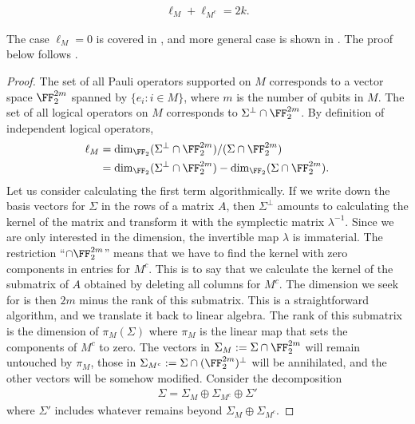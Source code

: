 \begin{prop}
\begin{align*}
\ell_M + \ell_{M^c} = 2k.
\end{align*}
\label{LogicalOperatorCounting}
\end{prop}
The case $\ell_M = 0$ is covered in \cite{BravyiTerhal2009no-go},
and more general case is shown in \cite{YoshidaChuang2010Framework}.
The proof below follows \cite{HaahPreskill2012tradeoff}.
\begin{proof}
The set of all Pauli operators supported on $M$
corresponds to a vector space $\FF_2^{2m}$
spanned by $\{ e_i : i \in M \}$, where $m$
is the number of qubits in $M$.
The set of all logical operators on $M$ corresponds to $\Sigma^\perp  \cap \FF_2^{2m}$.
By definition of independent logical operators,
\begin{align*}
\ell_M 
&= \dim_{\FF_2} (\Sigma^\perp \cap \FF_2^{2m}) / ( \Sigma \cap \FF_2^{2m} ) \\
&= \dim_{\FF_2} (\Sigma^\perp \cap \FF_2^{2m}) - \dim_{\FF_2} ( \Sigma \cap \FF_2^{2m} ).
\end{align*}
Let us consider calculating the first term algorithmically.
If we write down the basis vectors for $\Sigma$ in the rows of a matrix $A$,
then $\Sigma^\perp$ amounts to calculating the kernel of the matrix
and transform it with the symplectic matrix $\lambda^{-1}$.
Since we are only interested in the dimension, 
the invertible map $\lambda$ is immaterial.
The restriction ``$\cap \FF_2^{2m}$'' means that we have to find the kernel
with zero components in entries for $M^c$.
This is to say that we calculate the kernel of the submatrix of $A$
obtained by deleting all columns for $M^c$.
The dimension we seek for is then $2m$ minus the rank of this submatrix.
This is a straightforward algorithm, and we translate it back to linear algebra.
The rank of this submatrix is the dimension of $\pi_M(\Sigma)$
where $\pi_M$ is the linear map that sets the components of $M^c$ to zero.
The vectors in $\Sigma_M := \Sigma \cap \FF_2^{2m}$ will remain untouched by $\pi_M$,
those in $\Sigma_{M^c} := \Sigma \cap (\FF_2^{2m})^\perp$ will be annihilated,
and the other vectors will be somehow modified.
Consider the decomposition
\begin{align}
\Sigma = \Sigma_M \oplus \Sigma_{M^c} \oplus \Sigma'
\label{eq:SigmaDecomposition}
\end{align}
where $\Sigma'$ includes whatever remains beyond $\Sigma_M \oplus \Sigma_{M^c}$.

\end{proof}
